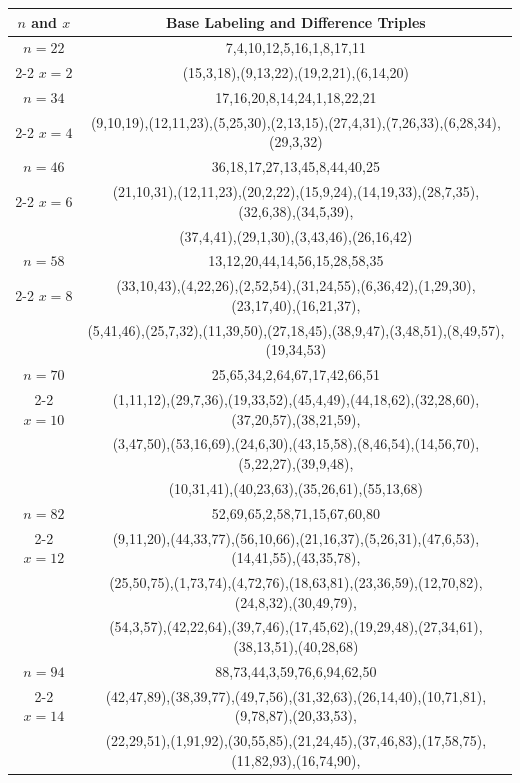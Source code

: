 \begin{tabular}{| c | c |}
\hline
\(n\) and \(x\) & Base Labeling and Difference Triples\\
\hline
\(n=22\) & 
7,4,10,12,5,16,1,8,17,11\\
\cline{2-2}
\(x=2\)
&(15,3,18),(9,13,22),(19,2,21),(6,14,20)\\
\hline 
\(n=34\) & 
17,16,20,8,14,24,1,18,22,21\\
\cline{2-2}
\(x=4\)
&(9,10,19),(12,11,23),(5,25,30),(2,13,15),(27,4,31),(7,26,33),(6,28,34),(29,3,32)\\
\hline 
\(n=46\) & 
36,18,17,27,13,45,8,44,40,25\\
\cline{2-2}
\(x=6\)
&(21,10,31),(12,11,23),(20,2,22),(15,9,24),(14,19,33),(28,7,35),(32,6,38),(34,5,39),\\
&(37,4,41),(29,1,30),(3,43,46),(26,16,42)\\
\hline 
\(n=58\) & 
13,12,20,44,14,56,15,28,58,35\\
\cline{2-2}
\(x=8\)
&(33,10,43),(4,22,26),(2,52,54),(31,24,55),(6,36,42),(1,29,30),(23,17,40),(16,21,37),\\
&(5,41,46),(25,7,32),(11,39,50),(27,18,45),(38,9,47),(3,48,51),(8,49,57),(19,34,53)\\
\hline 
\(n=70\) & 
25,65,34,2,64,67,17,42,66,51\\
\cline{2-2}
\(x=10\)
&(1,11,12),(29,7,36),(19,33,52),(45,4,49),(44,18,62),(32,28,60),(37,20,57),(38,21,59),\\
&(3,47,50),(53,16,69),(24,6,30),(43,15,58),(8,46,54),(14,56,70),(5,22,27),(39,9,48),\\
&(10,31,41),(40,23,63),(35,26,61),(55,13,68)\\
\hline 
\(n=82\) & 
52,69,65,2,58,71,15,67,60,80\\
\cline{2-2}
\(x=12\)
&(9,11,20),(44,33,77),(56,10,66),(21,16,37),(5,26,31),(47,6,53),(14,41,55),(43,35,78),\\
&(25,50,75),(1,73,74),(4,72,76),(18,63,81),(23,36,59),(12,70,82),(24,8,32),(30,49,79),\\
&(54,3,57),(42,22,64),(39,7,46),(17,45,62),(19,29,48),(27,34,61),(38,13,51),(40,28,68)\\
\hline 
\(n=94\) & 
88,73,44,3,59,76,6,94,62,50\\
\cline{2-2}
\(x=14\)
&(42,47,89),(38,39,77),(49,7,56),(31,32,63),(26,14,40),(10,71,81),(9,78,87),(20,33,53),\\
&(22,29,51),(1,91,92),(30,55,85),(21,24,45),(37,46,83),(17,58,75),(11,82,93),(16,74,90),\\

\end{tabular}
